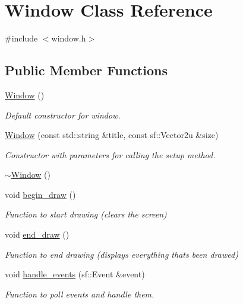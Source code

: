 \hypertarget{class_window}{}\section{Window Class Reference}
\label{class_window}


{\ttfamily \#include $<$window.\+h$>$}

\subsection*{Public Member Functions}
\begin{DoxyCompactItemize}
\item 
\hyperlink{class_window_a74e6087da23d3c24e9fac0245e5ec92c}{Window} ()
\begin{DoxyCompactList}\small\item\em Default constructor for window. \end{DoxyCompactList}\item 
\hyperlink{class_window_a11aa538fb51a75a2017d6a1b3c7ccd34}{Window} (const std\+::string \&title, const sf\+::\+Vector2u \&size)
\begin{DoxyCompactList}\small\item\em Constructor with parameters for calling the setup method. \end{DoxyCompactList}\item 
\hyperlink{class_window_a245d821e6016fa1f6970ccbbedd635f6}{$\sim$\+Window} ()
\item 
void \hyperlink{class_window_a9a01adf499565557def564579805c413}{begin\+\_\+draw} ()
\begin{DoxyCompactList}\small\item\em Function to start drawing (clears the screen) \end{DoxyCompactList}\item 
void \hyperlink{class_window_ae2d4995568b0bb68fd8dceff3cce216c}{end\+\_\+draw} ()
\begin{DoxyCompactList}\small\item\em Function to end drawing (displays everything that\textquotesingle{}s been drawed) \end{DoxyCompactList}\item 
void \hyperlink{class_window_ae7c221f904b304e507339e6e25ccd018}{handle\+\_\+events} (sf\+::\+Event \&event)
\begin{DoxyCompactList}\small\item\em Function to poll events and handle them. \end{DoxyCompactList}\item 

\end{DoxyCompactItemize}
